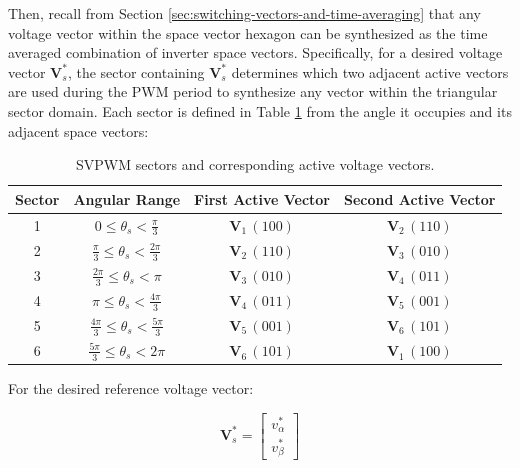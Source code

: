 \documentclass{article}
\begin{document}
Then, recall from Section \ref{sec:switching-vectors-and-time-averaging} that any voltage vector within the space vector hexagon can be synthesized as the time averaged combination of inverter space vectors. Specifically, for a desired voltage vector $\mathbf{V}_s^*$, the sector containing $\mathbf{V}_s^*$ determines which two adjacent active vectors are used during the PWM period to synthesize any vector within the triangular sector domain. Each sector is defined in Table \ref{tab:svpwm_sectors} from the angle it occupies and its adjacent space vectors:

\begin{table}[H]
    \centering
    \caption{SVPWM sectors and corresponding active voltage vectors.}
    \label{tab:svpwm_sectors}
    \begin{tabular}{c c c c}
        \hline
        \textbf{Sector} & \textbf{Angular Range} 
        & \textbf{First Active Vector} 
        & \textbf{Second Active Vector} \\
        \hline
        1 & $0 \leq \theta_s < \frac{\pi}{3}$
          & $\mathbf{V}_1\,(100)$ & $\mathbf{V}_2\,(110)$ \\[6pt]

        2 & $\frac{\pi}{3} \leq \theta_s < \frac{2\pi}{3}$
          & $\mathbf{V}_2\,(110)$ & $\mathbf{V}_3\,(010)$ \\[6pt]

        3 & $\frac{2\pi}{3} \leq \theta_s < \pi$
          & $\mathbf{V}_3\,(010)$ & $\mathbf{V}_4\,(011)$ \\[6pt]

        4 & $\pi \leq \theta_s < \frac{4\pi}{3}$
          & $\mathbf{V}_4\,(011)$ & $\mathbf{V}_5\,(001)$ \\[6pt]

        5 & $\frac{4\pi}{3} \leq \theta_s < \frac{5\pi}{3}$
          & $\mathbf{V}_5\,(001)$ & $\mathbf{V}_6\,(101)$ \\[6pt]

        6 & $\frac{5\pi}{3} \leq \theta_s < 2\pi$
          & $\mathbf{V}_6\,(101)$ & $\mathbf{V}_1\,(100)$ \\
        \hline
    \end{tabular}
\end{table}

For the desired reference voltage vector:

\begin{equation}
    \mathbf{V}_s^* =
    \begin{bmatrix}
        v_\alpha^* \\
        v_\beta^*
    \end{bmatrix}
\end{equation}
\end{document}
